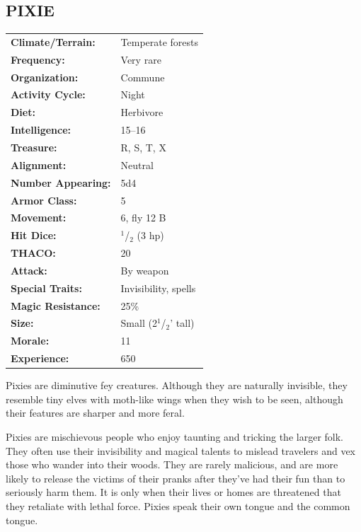\begin{multicols}{2}
\noindent
\begin{minipage}{\columnwidth}

\vspace{1em}

\subsection{PIXIE}

\noindent \begin{tabular}{p{}p{}}
\textbf{Climate/Terrain:}	& Temperate forests	\\
\textbf{Frequency:} 		& Very rare	\\
\textbf{Organization:} 		& Commune	\\
\textbf{Activity Cycle:} 	& Night	\\
\textbf{Diet:} 				& Herbivore	\\
\textbf{Intelligence:} 		& 15--16	\\
\textbf{Treasure:} 			& R, S, T, X	\\
\textbf{Alignment:} 		& Neutral	\\
\hline
\textbf{Number Appearing:} 	& 5d4	\\
\textbf{Armor Class:} 		& 5	\\
\textbf{Movement:} 			& 6, fly 12 B	\\
\textbf{Hit Dice:} 			& $^1$/$_2$	(3 hp)	\\
\textbf{THACO:} 			& 20	\\
\textbf{Attack:} 			& By weapon	\\
\textbf{Special Traits:} & Invisibility, spells	\\
\textbf{Magic Resistance:} 	& 25\%	\\
\textbf{Size:} 				& Small (2$^1$/$_2$' tall)	\\
\textbf{Morale:} 			& 11	\\
\textbf{Experience:} 		& 650	\\ %
\end{tabular}

\end{minipage}

Pixies are diminutive fey creatures. Although they are naturally invisible, they resemble tiny elves with moth-like wings when they wish to be seen, although their features are sharper and more feral.

Pixies are mischievous people who enjoy taunting and tricking the larger folk. They often use their invisibility and magical talents to mislead travelers and vex those who wander into their woods. They are rarely malicious, and are more likely to release the victims of their pranks after they've had their fun than to seriously harm them. It is only when their lives or homes are threatened that they retaliate with lethal force. Pixies speak their own tongue and the common tongue.


\end{multicols}

